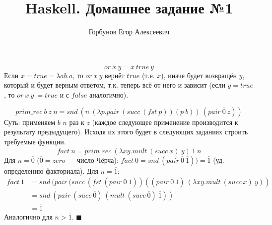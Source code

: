 

\title{Haskell. Домашнее задание №1}
\author{Горбунов Егор Алексеевич}


\maketitle

\[or\ x\ y = x\ true\ y\]
Если $x = true = \lambda ab.a$, то $or\ x\ y$ вернёт $true$ (т.е. $x$), иначе будет возвращён $y$, который и будет 
верным ответом, т.к. теперь всё от него и зависит (если $y = true$, то $or\ x\ y\ = true$ и с $false$ аналогично).

\[
prim\_rec\ b\ z\ n = snd\ (n\ (\lambda p.pair\ (succ\ (fst\ p))(p\ b))\ (pair\ \overline{0}\ z))
\]
Суть: применяем $b$ $n$ раз к $z$ (каждое следующее применение производится к результату предыдущего). Исходя их этого будет в следующих 
заданиях строить требуемые функции.
\[
fact\ n = prim\_rec\ (\lambda xy.mult\ (succ\ x)\ y)\ \overline{1}\ n
\]
Для $n = \overline{0}$ ($\overline{0}=zero$ --- число Чёрча): $fact\ 0 = snd\ (pair\ \overline{0}\ \overline{1})) = \overline{1}$ (уд. определению факториала).
Для $n = \overline{1}$: 
\begin{equation*}
\begin{split}
fact\ 1 &= snd\ (pair\ (succ\ (fst\ (pair\ \overline{0}\ \overline{1}))((pair\ \overline{0}\ \overline{1})\ (\lambda xy.mult\ (succ\ x)\ y)) \\
        &= snd\ (pair\ (succ\ \overline{0})\ (mult\ (succ\ \overline{0})\ \overline{1})) \\
        &= \overline{1}
\end{split}
\end{equation*}
Аналогично для $n > \overline{1}$. \hfill $\blacksquare$

